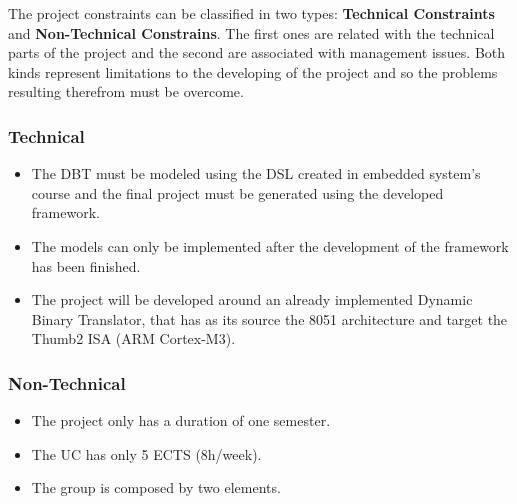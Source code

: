 The project constraints can be classified in two types: \textbf{Technical Constraints} and \textbf{Non-Technical Constrains}. The first ones are related with the technical parts of the project and the second are associated with management issues. Both kinds represent limitations to the developing of the project and so the problems resulting therefrom must be overcome.

\subsubsection{Technical}
\begin{itemize}
\item The DBT must be modeled using the DSL created in embedded system's course and the final project must be generated using the developed framework. 
\item The models can only be implemented after the development of the framework has been finished.
\item The project will be developed around an already implemented Dynamic Binary Translator, that has as its source the 8051 architecture and target the Thumb2 ISA (ARM Cortex-M3).
\end{itemize}

\subsubsection{Non-Technical}
\begin{itemize}
\item The project only has a duration of one semester.
\item The UC has only 5 ECTS (8h/week).
\item The group is composed by two elements.
\end{itemize}